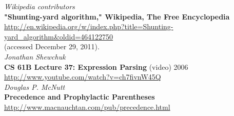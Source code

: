\documentclass[11pt]{article}
\begin{document}
\begin{thebibliography}{1}
{\em Wikipedia contributors} \\ 
{\bf "Shunting-yard algorithm," Wikipedia, The Free Encyclopedia} \\
\url{http://en.wikipedia.org/w/index.php?title=Shunting-yard_algorithm&oldid=464122750} \\
(accessed December 29, 2011). \\

{\em Jonathan Shewchuk} \\
{\bf CS 61B Lecture 37: Expression Parsing} (video) 2006 \\
\url{http://www.youtube.com/watch?v=ch7fivnW45Q} \\

{\em Douglas P. McNutt} \\
{\bf Precedence and Prophylactic Parentheses} \\
\url{http://www.macnauchtan.com/pub/precedence.html} \\
\end{thebibliography}
\end{document}
